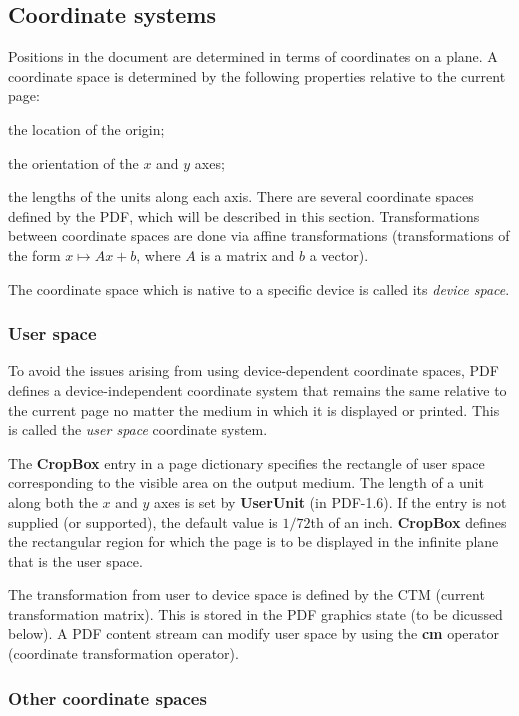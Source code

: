 \subsection{Coordinate systems}

Positions in the document are determined in terms of coordinates on a plane.
A coordinate space is determined by the following properties relative to the current page:
\blist
    \item the location of the origin;
    \item the orientation of the $x$ and $y$ axes;
    \item the lengths of the units along each axis.
\elist
There are several coordinate spaces defined by the PDF, which will be described in this section.
Transformations between coordinate spaces are done via affine transformations (transformations of the form
$x\mapsto Ax+b$, where $A$ is a matrix and $b$ a vector).

The coordinate space which is native to a specific device is called its {\it device space}.

\subsubsection{User space}

To avoid the issues arising from using device-dependent coordinate spaces, PDF defines a device-independent
coordinate system that remains the same relative to the current page no matter the medium in which it is
displayed or printed.
This is called the {\it user space} coordinate system.

The {\bf CropBox} entry in a page dictionary specifies the rectangle of user space corresponding to the visible
area on the output medium.
The length of a unit along both the $x$ and $y$ axes is set by {\bf UserUnit} (in PDF-1.6).
If the entry is not supplied (or supported), the default value is $1/72$th of an inch.
{\bf CropBox} defines the rectangular region for which the page is to be displayed in the infinite plane that
is the user space.

The transformation from user to device space is defined by the CTM (current transformation matrix).
This is stored in the PDF graphics state (to be dicussed below).
A PDF content stream can modify user space by using the {\bf cm} operator (coordinate transformation
operator).

\subsubsection{Other coordinate spaces}

